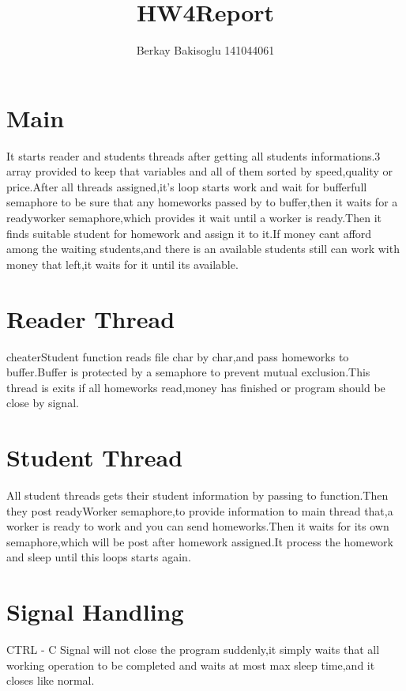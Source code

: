 \documentclass{article}
\title{HW4Report}
\author{Berkay Bakisoglu 141044061 }
\begin{document}
\maketitle

\section{Main}
    It starts reader and students threads after getting all students informations.3 array provided to keep that variables and all of them sorted by speed,quality or price.After all threads assigned,it's loop starts work and wait for bufferfull semaphore to be sure that any homeworks passed by to buffer,then it waits for a readyworker semaphore,which provides it wait until a worker is ready.Then it finds suitable student for homework and assign it to it.If money cant afford among the waiting students,and there is an available students still can work with money that left,it waits for it until its available.
\section{Reader Thread}
   cheaterStudent function reads file char by char,and pass homeworks to buffer.Buffer is protected by a semaphore to prevent mutual exclusion.This thread is exits if all homeworks read,money has finished or program should be close by signal.
\section{Student Thread}
    All student threads gets their student information by passing to function.Then they post readyWorker semaphore,to provide information to main thread that,a worker is ready to work and you can send homeworks.Then it waits for its own semaphore,which will be post after homework assigned.It process the homework and sleep until this loops starts again.
\section{Signal Handling}
    CTRL - C Signal will not close the program suddenly,it simply waits that all working operation to be completed and waits at most max sleep time,and it closes like normal.
\end{document}
